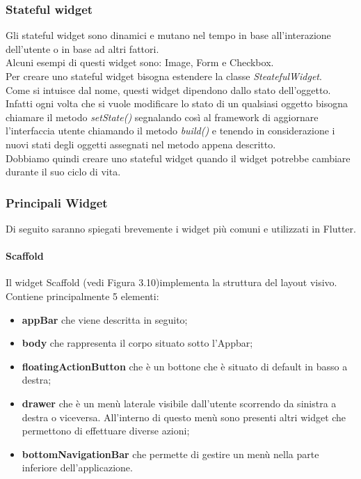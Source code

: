 \subsubsection{Stateful widget}
Gli stateful widget sono dinamici e mutano nel tempo in base all'interazione dell'utente o in base ad altri fattori.\\
Alcuni esempi di questi widget sono: Image, Form e Checkbox.\\
Per creare uno stateful widget bisogna estendere la classe \textit{SteatefulWidget}.\\
Come si intuisce dal nome, questi widget dipendono dallo stato dell'oggetto. Infatti ogni volta che si vuole modificare lo stato di un qualsiasi oggetto bisogna chiamare il metodo \textit{setState()} segnalando così al framework di aggiornare l'interfaccia utente chiamando il metodo \textit{build()} e tenendo in considerazione i nuovi stati degli oggetti assegnati nel metodo appena descritto. \\
Dobbiamo quindi creare uno stateful widget quando il widget potrebbe cambiare durante il suo ciclo di vita. 

\newpage

\subsubsection{Principali Widget}
Di seguito saranno spiegati brevemente i widget più comuni e utilizzati in Flutter.

\paragraph{Scaffold}
Il widget Scaffold \cite{scaffold} (vedi Figura 3.10)implementa la struttura del layout visivo.\\
Contiene principalmente 5 elementi:
\begin{itemize}
	\item \textbf{appBar} che viene descritta in seguito;   
	\item \textbf{body} che rappresenta il corpo situato sotto l'Appbar;
	\item \textbf{floatingActionButton} che è un bottone che è situato di default in basso a destra;   
	\item \textbf{drawer} che è un menù laterale visibile dall'utente scorrendo da sinistra a destra o viceversa. All'interno di questo menù sono presenti altri widget che permettono di effettuare diverse azioni;
	\item \textbf{bottomNavigationBar} che permette di gestire un menù nella parte inferiore dell'applicazione.
\end{itemize}

